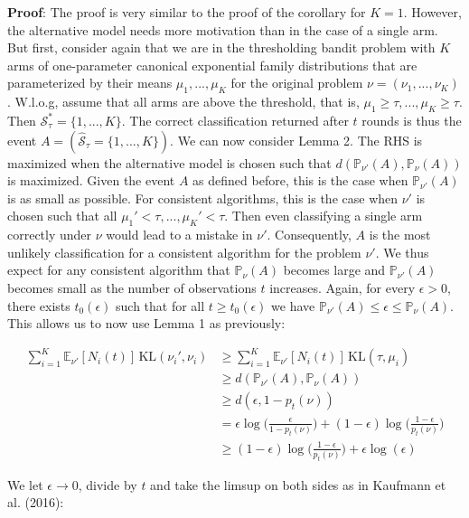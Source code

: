 \documentclass[11pt,]{article}
\newcommand{\KL}{\,\text{KL}}
\begin{document}
\textbf{Proof}: The proof is very similar to the proof of the corollary
for \(K=1\). However, the alternative model needs more motivation than
in the case of a single arm. But first, consider again that we are in
the thresholding bandit problem with \(K\) arms of one-parameter
canonical exponential family distributions that are parameterized by
their means \(\mu_1, ..., \mu_K\) for the original problem
\(\nu = (\nu_1, ..., \nu_K)\). W.l.o.g, assume that all arms are above
the threshold, that is, \(\mu_1 \geq \tau, ..., \mu_K \geq \tau\). Then
\(\mathcal{S}_{\tau}^* = \{1, ... , K\}\). The correct classification
returned after \(t\) rounds is thus the event
\(A = (\hat{\mathcal{S}}_{\tau} = \{1, ..., K\})\). We can now consider
Lemma 2. The RHS is maximized when the alternative model is chosen such
that \(d(\mathbb{P}_{\nu'}(A), \mathbb{P}_{\nu}(A))\) is maximized.
Given the event \(A\) as defined before, this is the case when
\(\mathbb{P}_{\nu'}(A)\) is as small as possible. For consistent
algorithms, this is the case when \(\nu'\) is chosen such that all
\(\mu_1' < \tau, ..., \mu_K' < \tau\). Then even classifying a single
arm correctly under \(\nu\) would lead to a mistake in \(\nu'\).
Consequently, \(A\) is the most unlikely classification for a consistent
algorithm for the problem \(\nu'\). We thus expect for any consistent
algorithm that \(\mathbb{P}_{\nu}(A)\) becomes large and
\(\mathbb{P}_{\nu'}(A)\) becomes small as the number of observations
\(t\) increases. Again, for every \(\epsilon > 0\), there exists
\(t_0(\epsilon)\) such that for all \(t \geq t_0(\epsilon)\) we have
\(\mathbb{P}_{\nu'}(A) \leq \epsilon \leq \mathbb{P}_\nu(A)\). This
allows us to now use Lemma 1 as previously:

\begin{align*}
\sum_{i=1}^K \mathbb{E}_{\nu'}[N_i(t)]\KL(\nu_i', \nu_i) & \geq \sum_{i=1}^K \mathbb{E}_{\nu'}[N_i(t)]\KL(\tau, \mu_i) \\
& \geq d(\mathbb{P}_{\nu'}(A), \mathbb{P}_{\nu}(A)) \\
& \geq d(\epsilon, 1-p_t(\nu)) \\
& = \epsilon \log \Big(\frac{\epsilon}{1-p_t(\nu)}\Big) + (1-\epsilon) \log \Big( \frac{1-\epsilon}{p_t(\nu)}\Big) \\
& \geq (1-\epsilon) \log \Big(\frac{1-\epsilon}{p_t(\nu)}\Big) + \epsilon \log(\epsilon)
\end{align*}

We let \(\epsilon \rightarrow 0\), divide by \(t\) and take the limsup
on both sides as in Kaufmann et al. (2016):
\end{document}
